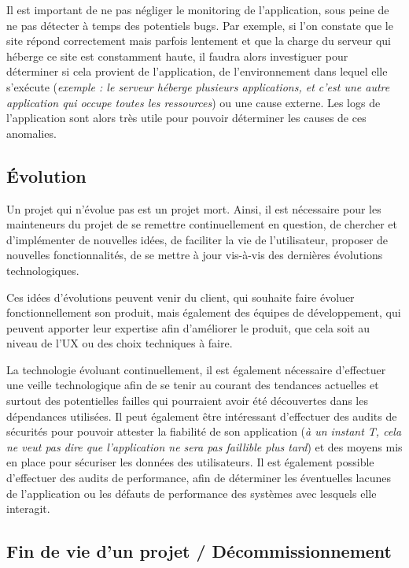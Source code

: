 Il est important de ne pas négliger le monitoring de l'application, sous peine de ne pas détecter à temps des potentiels bugs. Par exemple, si l'on constate que le site répond correctement mais parfois lentement et que la charge du serveur qui héberge ce site est constamment haute, il faudra alors investiguer pour déterminer si cela provient de l'application, de l'environnement dans lequel elle s'exécute (\emph{exemple : le serveur héberge plusieurs applications, et c'est une autre application qui occupe toutes les ressources}) ou une cause externe. Les logs de l'application sont alors très utile pour pouvoir déterminer les causes de ces anomalies.

\subsection{Évolution}

Un projet qui n'évolue pas est un projet mort. Ainsi, il est nécessaire pour les mainteneurs du projet de se remettre continuellement en question, de chercher et d'implémenter de nouvelles idées, de faciliter la vie de l'utilisateur, proposer de nouvelles fonctionnalités, de se mettre à jour vis-à-vis des dernières évolutions technologiques. 

Ces idées d'évolutions peuvent venir du client, qui souhaite faire évoluer fonctionnellement son produit, mais également des équipes de développement, qui peuvent apporter leur expertise afin d'améliorer le produit, que cela soit au niveau de l'\gls{UX} ou des choix techniques à faire.

La technologie évoluant continuellement, il est également nécessaire d'effectuer une veille technologique afin de se tenir au courant des tendances actuelles et surtout des potentielles failles qui pourraient avoir été découvertes dans les dépendances utilisées. Il peut également être intéressant d'effectuer des audits de sécurités pour pouvoir attester la fiabilité de son application (\emph{à un instant T, cela ne veut pas dire que l'application ne sera pas faillible plus tard}) et des moyens mis en place pour sécuriser les données des utilisateurs. Il est également possible d'effectuer des audits de performance, afin de déterminer les éventuelles lacunes de l'application ou les défauts de performance des systèmes avec lesquels elle interagit.

\subsection{Fin de vie d'un projet / Décommissionnement}

